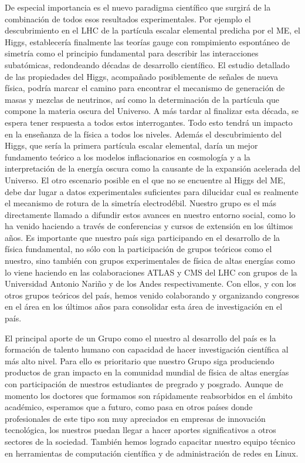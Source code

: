 De especial importancia es el nuevo paradigma científico que surgirá
de la combinación de todos esos resultados experimentales. Por ejemplo
el descubrimiento en el LHC de la partícula escalar elemental predicha
por el ME, el Higgs, establecería finalmente las teorías
gauge con rompimiento espontáneo de simetría como el principio
fundamental para describir las interacciones subatómicas, redondeando
décadas de desarrollo científico.  El estudio detallado de las
propiedades del Higgs, acompañado posiblemente de señales
de nueva física, podría marcar el camino para encontrar el mecanismo
de generación de masas y mezclas de neutrinos, así como la
determinación de la partícula que compone la materia oscura del
Universo. A más tardar al finalizar esta década, se espera tener
respuesta a todos estos interrogantes. Todo esto tendrá un impacto en la
enseñanza de la física a todos los niveles. Además el descubrimiento
del Higgs, que sería la primera partícula escalar elemental, daría un
mejor fundamento teórico a los modelos inflacionarios en cosmología y
a la interpretación de la energía oscura como la causante de la
expansión acelerada del Universo. El otro escenario posible en el que
no se encuentre al Higgs del ME, debe dar lugar a datos
experimentales suficientes para dilucidar cual es realmente el
mecanismo de rotura de la simetría electrodébil. Nuestro grupo es el
más directamente llamado a difundir estos avances en nuestro entorno social,
como lo ha venido haciendo a través de conferencias y cursos de
extensión en los últimos años. Es importante que nuestro país siga
participando en el desarrollo de la física fundamental, no sólo con la
participación de grupos teóricos como el nuestro, sino también con
grupos experimentales de física de altas energías como lo viene
haciendo en las colaboraciones ATLAS y CMS del LHC con grupos de la
Universidad Antonio Nariño y de los Andes respectivamente. Con ellos,
y con los otros grupos teóricos del país, hemos venido colaborando y
organizando congresos en el área en los últimos años para consolidar
esta área de investigación en el país.

El principal aporte de un Grupo como el nuestro al desarrollo del país
es la formación de talento humano con capacidad de hacer investigación
científica al más alto nivel. Para ello es prioritario que nuestro
Grupo siga produciendo productos de gran impacto en la comunidad
mundial de física de altas energías con participación de nuestros
estudiantes de pregrado y posgrado.  Aunque de momento los doctores
que formamos son rápidamente reabsorbidos en el ámbito académico,
esperamos que a futuro, como pasa en otros países donde profesionales
de este tipo son muy apreciados en empresas de innovación tecnológica,
los nuestros puedan llegar a hacer aportes significativos a otros
sectores de la sociedad. También hemos logrado capacitar nuestro
equipo técnico en herramientas de computación científica y de
administración de redes en Linux.


